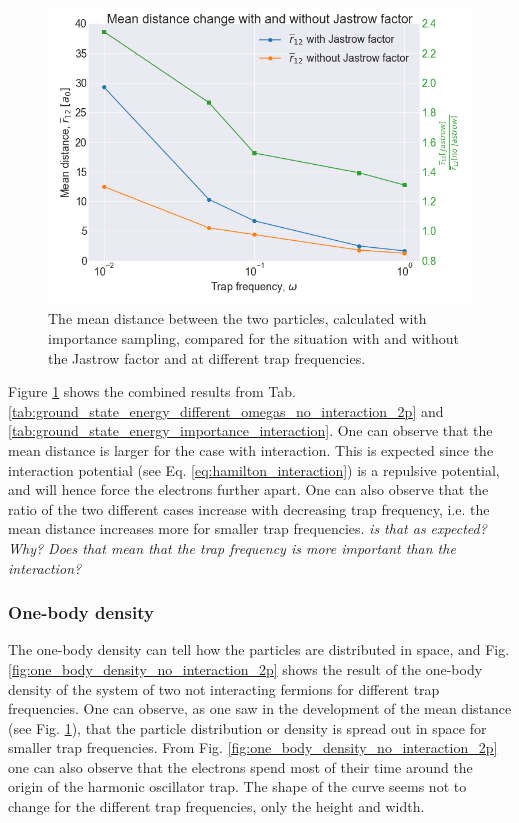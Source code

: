 \begin{figure}[H]
\center
\includegraphics[width=0.7\linewidth]{../Results/mean_distance_change}\caption{The mean distance between the two particles, calculated with importance sampling, compared for the situation with and without the Jastrow factor and at different trap frequencies. }\label{fig:mean_distance_compared}
\end{figure}

Figure \ref{fig:mean_distance_compared} shows the combined results from Tab. \ref{tab:ground_state_energy_different_omegas_no_interaction_2p} and \ref{tab:ground_state_energy_importance_interaction}. One can observe that the mean distance is larger for the case with interaction. This is expected since the interaction potential (see Eq. \ref{eq:hamilton_interaction}) is a repulsive potential, and will hence force the electrons further apart. One can also observe that the ratio of the two different cases increase with decreasing trap frequency, i.e. the mean distance increases more for smaller trap frequencies. \textit{is that as expected? Why? Does that mean that the trap frequency is more important than the interaction?}

\subsubsection{One-body density}

The one-body density can tell how the particles are distributed in space, and Fig. \ref{fig:one_body_density_no_interaction_2p} shows the result of the one-body density of the system of two not interacting fermions for different trap frequencies. One can observe, as one saw in the development of the mean distance (see Fig. \ref{fig:mean_distance_compared}), that the particle distribution or density is spread out in space for smaller trap frequencies. From Fig. \ref{fig:one_body_density_no_interaction_2p} one can also observe that the electrons spend most of their time around the origin of the harmonic oscillator trap. The shape of the curve seems not to change for the different trap frequencies, only the height and width.

